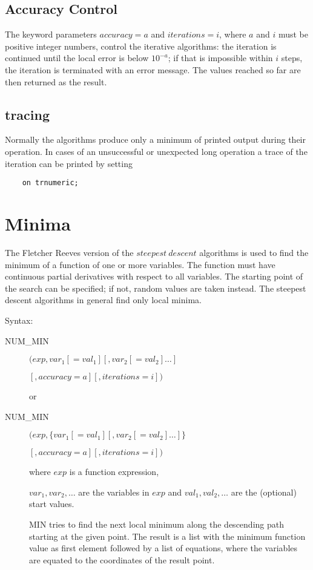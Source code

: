 \subsection{Accuracy Control}
 
The keyword parameters $accuracy=a$ and $iterations=i$, where
$a$ and $i$ must be positive integer numbers, control the
iterative algorithms: the iteration is continued until
the local error is below $10^{-a}$; if that is impossible
within $i$ steps, the iteration is terminated with an
error message. The values reached so far are then returned
as the result.

\subsection{tracing}

Normally the algorithms produce only a minimum of printed
output during their operation. In cases of an unsuccessful 
or unexpected long operation a trace of the iteration can be
printed by setting
 
\begin{verbatim}
    on trnumeric;
\end{verbatim}
 

\section{Minima}
 
The Fletcher Reeves version of the $steepest\ descent$
algorithms is used to find the minimum of a
function of one or more variables. The
function must have continuous partial derivatives with respect to all
variables. The starting point of the search can be
specified; if not, random values are taken instead.
The steepest descent algorithms in general find only local
minima.
 
Syntax:

\begin{description}
\item[NUM\_MIN] $(exp, var_1[=val_1] [,var_2[=val_2] \ldots]$
 
$             [,accuracy=a][,iterations=i]) $
 
or

\item[NUM\_MIN] $(exp, \{ var_1[=val_1] [,var_2[=val_2] \ldots] \}$

$             [,accuracy=a][,iterations=i]) $


where $exp$ is a function expression,

$var_1, var_2, \ldots$ are the variables in $exp$ and
$val_1,val_2, \ldots$ are the (optional) start values.

MIN tries to find the next local minimum along the descending
path starting at the given point. The result is a list
with the minimum function value as first element followed by a list
of equations, where the variables are equated to the coordinates 
of the result point.
\end{description}

